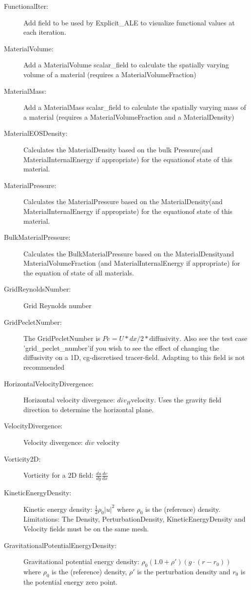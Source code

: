 \begin{description}
\item[FunctionalIter:]Add field to be used by Explicit\_ALE to visualize functional values at each iteration.  
\item[MaterialVolume:]Add a MaterialVolume scalar\_field to calculate the spatially varying volume of a material (requires a MaterialVolumeFraction)  
\item[MaterialMass:]Add a MaterialMass scalar\_field to calculate the spatially varying mass of a material (requires a MaterialVolumeFraction and a MaterialDensity)  
\item[MaterialEOSDensity:]Calculates the MaterialDensity based on the bulk Pressure(and MaterialInternalEnergy if appropriate) for the equationof state of this material.  
\item[MaterialPressure:]Calculates the MaterialPressure based on the MaterialDensity(and MaterialInternalEnergy if appropriate) for the equationof state of this material.  
\item[BulkMaterialPressure:]Calculates the BulkMaterialPressure based on the MaterialDensityand MaterialVolumeFraction (and MaterialInternalEnergy if appropriate) for the equation of state of all materials.  
\item[GridReynoldsNumber:]Grid Reynolds number  
\item[GridPecletNumber:]The GridPecletNumber is $Pe = U*dx/2*\mbox{diffusivity}$.
	Also see the test case 'grid\_peclet\_number'if you wish to see the effect of changing the diffusivity on a 1D, cg-discretised tracer-field.
	Adapting to this field is not recommended  
\item[HorizontalVelocityDivergence:]Horizontal velocity divergence: ${div}_H \mbox{velocity}$. Uses the gravity field direction to determine the horizontal plane.  
\item[VelocityDivergence:]Velocity divergence: $div \mbox{ velocity}$  
\item[Vorticity2D:]Vorticity for a 2D field: $\frac{du}{dy} \frac{dv}{dx}$  
\item[KineticEnergyDensity:]Kinetic energy density: $\frac{1}{2} \rho_0 |u|^2$ where $\rho_0$ is the (reference) density.
	Limitations: The Density, PerturbationDensity, KineticEnergyDensity and Velocity fields must be on the same mesh.  
\item[GravitationalPotentialEnergyDensity:]Gravitational potential energy density: $\rho_0 (1.0 + \rho') (g \cdot (r - r_0))$ where $\rho_0$ is the (reference) density, $\rho'$ is the perturbation density and $r_0$ is the potential energy zero point.

\end{description}
